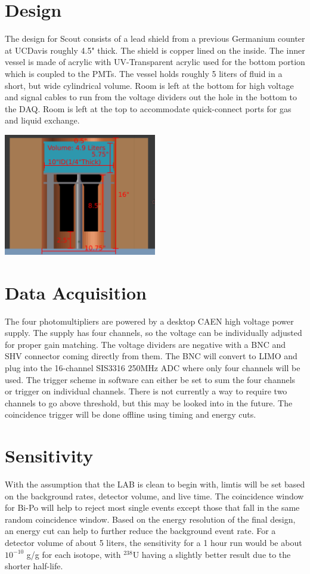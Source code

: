 \documentclass[]{article}
\begin{document}
\section{Design}
The design for Scout consists of a lead shield from a previous Germanium counter at
UCDavis roughly 4.5" thick. The shield is copper lined on the inside. The inner vessel
is made of acrylic with UV-Transparent acrylic used for the bottom portion which is
coupled to the PMTs. The vessel holds roughly 5 liters of fluid in a short, but wide
cylindrical volume.
Room is left at the bottom for high voltage and signal cables to run from the voltage
dividers out the hole in the bottom to the DAQ. Room is left at the top to
accommodate quick-connect ports for gas and liquid exchange.
\begin{center}
\includegraphics[width=0.5\textwidth]{flat_scout.png}
\end{center}

\section{Data Acquisition}
The four photomultipliers are powered by a desktop CAEN high voltage power supply. The supply
has four channels, so the voltage can be individually adjusted for proper gain matching. The
voltage dividers are negative with a BNC and SHV connector coming directly from them. The BNC
will convert to LIMO and plug into the 16-channel SIS3316 250MHz ADC where only four channels
will be used. The trigger scheme in software can either be set to sum the four channels or
trigger on individual channels. There is not currently a way to require two channels to go
above threshold, but this may be looked into in the future. The coincidence trigger will be
done offline using timing and energy cuts.

\section{Sensitivity}
With the assumption that the LAB is clean to begin with, limtis will be set based on the background
rates, detector volume, and live time. The coincidence window for Bi-Po will help to reject most single
events except those that fall in the same random coincidence window. Based on the energy resolution
of the final design, an energy cut can help to further reduce the background event rate. For a detector
volume of about 5 liters, the sensitivity for a 1 hour run would be about $10^{-10}$ g/g for each
isotope, with $^{238}$U having a slightly better result due to the shorter half-life.
\end{document}
